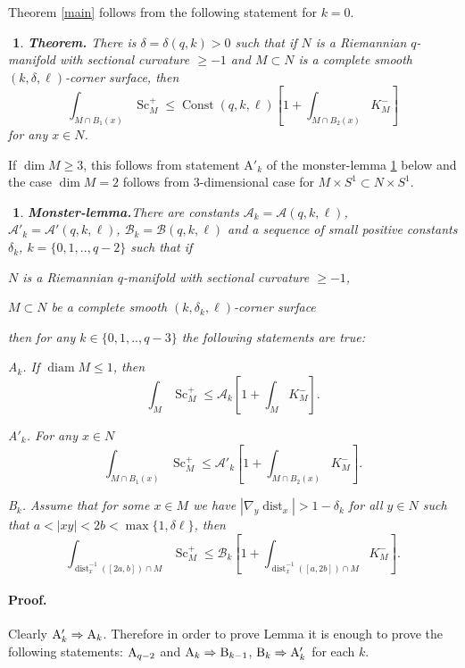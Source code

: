 \documentclass{article}
\def\cA{{\mathcal A}}
\def\cB{{\mathcal B}}
\def\ge{\geqslant}
\def\le{\leqslant}
\def\i{\subset}
\def\l{\left}
\def\r{\right}
\def\Const{\operatorname{Const}}
\def\diam{\operatorname{diam}}
\def\dim{\operatorname{dim}}
\def\dist{\operatorname{dist}}
\def\Sc{\operatorname{Sc}}
\newtheorem{Nothing}[thm]{$\!\!\!$}
\begin{document}
Theorem \ref{main} follows from the following statement for $k=0$.

\begin{Nothing}{\bf Theorem.} There is $\delta=\delta(q,k)>0$ such that if $N$ is
a Riemannian $q$-manifold with sectional curvature $\ge -1$ and $M\i N$ is
a complete smooth $(k,\delta,\ell)$-corner surface, then
$$\int_{M\cap B_1(x)}\Sc^+_M\le \Const(q,k,\ell)\l[1+\int_{M\cap B_2(x)}K^-_M\r]$$
for any $x\in N$.
\end{Nothing}

If $\dim M\ge 3$, this follows from statement A$'_k$ of the monster-lemma \ref{monster} below and the case $\dim M= 2$ follows from 3-dimensional case for $M\times S^1\i N\times S^1$.

\begin{Nothing}{\bf Monster-lemma.}\label{monster}
There are constants $\cA_k=\cA(q,k,\ell)$, $\cA'_k=\cA'(q,k,\ell)$,  $\cB_k=\cB(q,k,\ell)$ and a sequence of small positive  constants $\delta_k$, $k=\{0,1,..,q-2\}$ such that if
\begin{description}
\item $N$ is a Riemannian $q$-manifold with sectional curvature $\ge -1$,
\item $M\i N$ be a complete  smooth  $(k,\delta_k,\ell)$-corner surface
\end{description}
then for any $k\in \{0,1,..,q-3\}$ the following statements are true:

\begin{description}

\item{A$_k$.} If $\diam M\le 1$, then
$$\int_{M}\Sc^+_M\le \cA_k\l[1+\int_{M}K^-_M\r].$$


\item{A$'_k$.} For any $x\in N$
$$\int_{M\cap B_1(x)}\Sc^+_M\le \cA'_k\l[1+\int_{M\cap B_2(x)}K^-_M\r].$$


\item{B$_k$.}
Assume that for some $x\in M$ we have $|\nabla_y\dist_x|>1-\delta_k$ for all
$y\in N$ such that $a<|x y|<2b<\max\{1,\delta\ell\}$, then
$$\int_{\dist_x^{-1}([2a,b])\cap M}\Sc^+_{M}
\le  \cB_k\l[1+\int_{\dist_x^{-1}([a,2b])\cap M}K^-_{M}\r].$$
\end{description}
\end{Nothing}




\paragraph*{Proof.} Clearly ${\rm A}'_k\Rightarrow {\rm A}_k$.
Therefore in order to prove Lemma it is enough to prove the following statements:
${\rm A}_{q-2}$ and ${\rm A}_k\Rightarrow {\rm B}_{k-1}$, ${\rm B}_k\Rightarrow {\rm A}'_{k}$ for each $k$.
\end{document}
